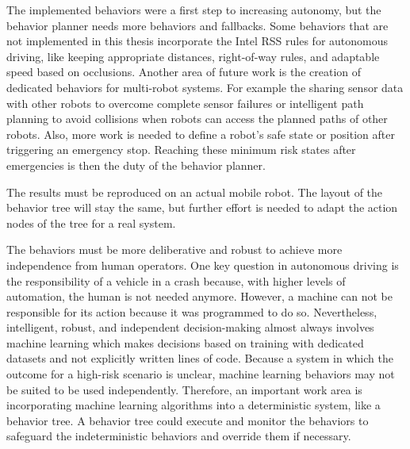 The implemented behaviors were a first step to increasing autonomy, but the behavior planner needs more behaviors and fallbacks. Some behaviors that are not implemented in this thesis incorporate the Intel RSS rules for autonomous driving, like keeping appropriate distances, right-of-way rules, and adaptable speed based on occlusions.
Another area of future work is the creation of dedicated behaviors for multi-robot systems. For example the sharing sensor data with other robots to overcome complete sensor failures or intelligent path planning to avoid collisions when robots can access the planned paths of other robots. 
Also, more work is needed to define a robot's safe state or position after triggering an emergency stop. Reaching these minimum risk states after emergencies is then the duty of the behavior planner.

The results must be reproduced on an actual mobile robot. The layout of the behavior tree will stay the same, but further effort is needed to adapt the action nodes of the tree for a real system. 

The behaviors must be more deliberative and robust to achieve more independence from human operators. One key question in autonomous driving is the responsibility of a vehicle in a crash because, with higher levels of automation, the human is not needed anymore. However, a machine can not be responsible for its action because it was programmed to do so. Nevertheless, intelligent, robust, and independent decision-making almost always involves machine learning which makes decisions based on training with dedicated datasets and not explicitly written lines of code. Because a system in which the outcome for a high-risk scenario is unclear, machine learning behaviors may not be suited to be used independently. Therefore, an important work area is incorporating machine learning algorithms into a deterministic system, like a behavior tree. A behavior tree could execute and monitor the behaviors to safeguard the indeterministic behaviors and override them if necessary.

 
